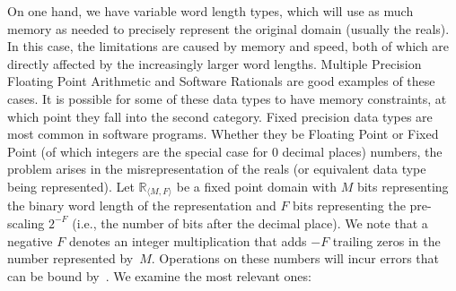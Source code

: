 \documentclass[a4paper,UKenglish]{lipics-v2018}
\begin{document}
On one hand, we have variable word length types, which will use as much
memory as needed to precisely represent the original domain (usually the
reals).  In this case, the limitations are caused by memory and speed, both
of which are directly affected by the increasingly larger word lengths. 
Multiple Precision Floating Point Arithmetic and Software Rationals are good
examples of these cases.  It is possible for some of these data types to
have memory constraints, at which point they fall into the second category. 
Fixed precision data types are most common in software programs.  Whether
they be Floating Point or Fixed Point (of which integers are the special
case for 0 decimal places) numbers, the problem arises in the
misrepresentation of the reals (or equivalent data type being represented). 
Let $\mathbb{R}_{\langle M,F \rangle}$ be a fixed point domain with $M$ bits
representing the binary word length of the representation and $F$ bits
representing the pre-scaling $2^{-F}$ (i.e., the number of bits after
the decimal place).  We note that a negative $F$ denotes an integer
multiplication that adds $-F$ trailing zeros in the number represented
by~$M$.
%
Operations on these numbers will incur errors that can be bound
by~\cite{DBLP:conf/arith/BrainTRW15}.  We examine the most relevant ones:
%
\end{document}
